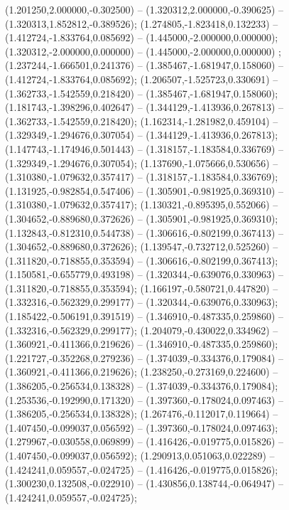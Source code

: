  (1.201250,2.000000,-0.302500) -- (1.320312,2.000000,-0.390625) -- (1.320313,1.852812,-0.389526);
 (1.274805,-1.823418,0.132233) -- (1.412724,-1.833764,0.085692) -- (1.445000,-2.000000,0.000000);
 (1.320312,-2.000000,0.000000) -- (1.445000,-2.000000,0.000000) ;
 (1.237244,-1.666501,0.241376) -- (1.385467,-1.681947,0.158060) -- (1.412724,-1.833764,0.085692);
 (1.206507,-1.525723,0.330691) -- (1.362733,-1.542559,0.218420) -- (1.385467,-1.681947,0.158060);
 (1.181743,-1.398296,0.402647) -- (1.344129,-1.413936,0.267813) -- (1.362733,-1.542559,0.218420);
 (1.162314,-1.281982,0.459104) -- (1.329349,-1.294676,0.307054) -- (1.344129,-1.413936,0.267813);
 (1.147743,-1.174946,0.501443) -- (1.318157,-1.183584,0.336769) -- (1.329349,-1.294676,0.307054);
 (1.137690,-1.075666,0.530656) -- (1.310380,-1.079632,0.357417) -- (1.318157,-1.183584,0.336769);
 (1.131925,-0.982854,0.547406) -- (1.305901,-0.981925,0.369310) -- (1.310380,-1.079632,0.357417);
 (1.130321,-0.895395,0.552066) -- (1.304652,-0.889680,0.372626) -- (1.305901,-0.981925,0.369310);
 (1.132843,-0.812310,0.544738) -- (1.306616,-0.802199,0.367413) -- (1.304652,-0.889680,0.372626);
 (1.139547,-0.732712,0.525260) -- (1.311820,-0.718855,0.353594) -- (1.306616,-0.802199,0.367413);
 (1.150581,-0.655779,0.493198) -- (1.320344,-0.639076,0.330963) -- (1.311820,-0.718855,0.353594);
 (1.166197,-0.580721,0.447820) -- (1.332316,-0.562329,0.299177) -- (1.320344,-0.639076,0.330963);
 (1.185422,-0.506191,0.391519) -- (1.346910,-0.487335,0.259860) -- (1.332316,-0.562329,0.299177);
 (1.204079,-0.430022,0.334962) -- (1.360921,-0.411366,0.219626) -- (1.346910,-0.487335,0.259860);
 (1.221727,-0.352268,0.279236) -- (1.374039,-0.334376,0.179084) -- (1.360921,-0.411366,0.219626);
 (1.238250,-0.273169,0.224600) -- (1.386205,-0.256534,0.138328) -- (1.374039,-0.334376,0.179084);
 (1.253536,-0.192990,0.171320) -- (1.397360,-0.178024,0.097463) -- (1.386205,-0.256534,0.138328);
 (1.267476,-0.112017,0.119664) -- (1.407450,-0.099037,0.056592) -- (1.397360,-0.178024,0.097463);
 (1.279967,-0.030558,0.069899) -- (1.416426,-0.019775,0.015826) -- (1.407450,-0.099037,0.056592);
 (1.290913,0.051063,0.022289) -- (1.424241,0.059557,-0.024725) -- (1.416426,-0.019775,0.015826);
 (1.300230,0.132508,-0.022910) -- (1.430856,0.138744,-0.064947) -- (1.424241,0.059557,-0.024725);
